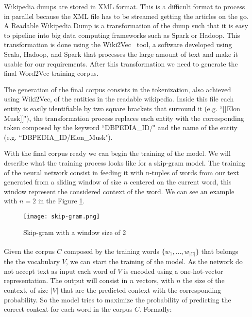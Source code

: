 Wikipedia dumps are stored in XML format. This is a difficult format to process in parallel because the XML file has to be streamed getting the articles on the go. A Readable Wikipedia Dump is a transformation of the dump such that it is easy to pipeline into big data computing frameworks such as Spark or Hadoop. This transformation is done using the Wiki2Vec~\cite{wiki2vec} tool, a software developed using Scala, Hadoop, and Spark that processes the large amount of text and make it usable for our requirements. After this transformation we need to generate the final Word2Vec training corpus. 

The generation of the final corpus consists in the tokenization, also achieved using Wiki2Vec, of the entities in the readable wikipedia. Inside this file each entity is easily identifiable by  two square brackets that surround it (e.g. ``[[Elon Musk]]"), the transformation process replaces each entity with the corresponding token composed by the keyword ``DBPEDIA\_ID/" and the name of the entity (e.g. \mbox{``DBPEDIA\_ID/Elon\_Musk"}).

With the final corpus ready we can begin the training of the model. We will describe what the training process looks like for a skip-gram model. The training of the neural network consist in feeding it with n-tuples of words from our text generated from a sliding window of size \(n\) centered on the current word, this window represent the considered context of the word. We can see an example with \(n = 2\) in the Figure \ref{fig:skip_gram}.

\vspace{-10pt}
\begin{figure}[h]
\texttt{[image: skip-gram.png]}
\caption{Skip-gram with a window size of 2}
\label{fig:skip_gram}
\end{figure}


\paragraph{}
Given the corpus \(C\) composed by the training words \(\{w_1, \dots, w_{|C|}\}\) that belongs the the vocabulary \(V\), we can start the training of the model. As the network do not accept text as input each word of \(V\) is encoded using a one-hot-vector representation. The output will consist in \(n\) vectors, with \(n\) the size of the context, of size \(|V|\) that are the predicted context with the corresponding probability. So the model tries to maximize the probability of predicting the correct context for each word in the corpus \(C\). Formally: 

